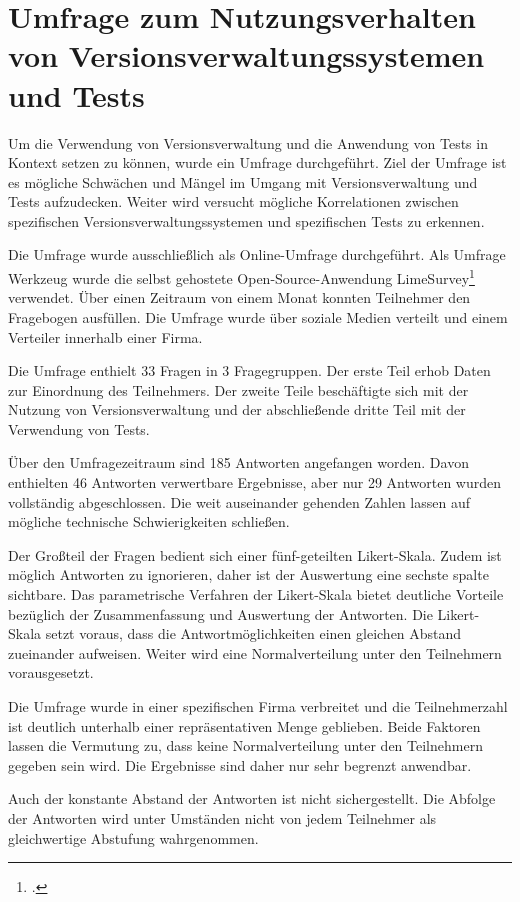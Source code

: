 \section{Umfrage zum Nutzungsverhalten von Versionsverwaltungssystemen und Tests}
\label{survey-vcs-test}

Um die Verwendung von Versionsverwaltung und die Anwendung von Tests in Kontext setzen zu können, wurde ein Umfrage durchgeführt.
Ziel der Umfrage ist es mögliche Schwächen und Mängel im Umgang mit Versionsverwaltung und Tests aufzudecken. Weiter wird versucht mögliche Korrelationen zwischen spezifischen Versionsverwaltungssystemen und spezifischen Tests zu erkennen.

Die Umfrage wurde ausschließlich als Online-Umfrage durchgeführt. Als Umfrage Werkzeug wurde die selbst gehostete Open-Source-Anwendung \glqq LimeSurvey\grqq{}\footcite[][]{limesurvey} verwendet. Über einen Zeitraum von einem Monat konnten Teilnehmer den Fragebogen ausfüllen. Die Umfrage wurde über soziale Medien verteilt und einem Verteiler innerhalb einer Firma.

Die Umfrage enthielt 33 Fragen in 3 Fragegruppen. Der erste Teil erhob Daten zur Einordnung des Teilnehmers. Der zweite Teile beschäftigte sich mit der Nutzung von Versionsverwaltung und der abschließende dritte Teil mit der Verwendung von Tests.

Über den Umfragezeitraum sind 185 Antworten angefangen worden. Davon enthielten 46 Antworten verwertbare Ergebnisse, aber nur 29 Antworten wurden vollständig abgeschlossen. Die weit auseinander gehenden Zahlen lassen auf mögliche technische Schwierigkeiten schließen.

Der Großteil der Fragen bedient sich einer fünf-geteilten Likert-Skala. Zudem ist möglich Antworten zu ignorieren, daher ist der Auswertung eine sechste spalte sichtbare. Das parametrische Verfahren  der Likert-Skala bietet deutliche Vorteile bezüglich der Zusammenfassung und Auswertung der Antworten. Die Likert-Skala setzt voraus, dass die Antwortmöglichkeiten einen gleichen Abstand zueinander aufweisen. Weiter wird eine Normalverteilung unter den Teilnehmern vorausgesetzt. 

Die Umfrage wurde in einer spezifischen Firma verbreitet und die Teilnehmerzahl ist deutlich unterhalb einer repräsentativen Menge geblieben. Beide Faktoren lassen die Vermutung zu, dass keine Normalverteilung unter den Teilnehmern gegeben sein wird. Die Ergebnisse sind daher nur sehr begrenzt anwendbar.

Auch der konstante Abstand der Antworten ist nicht sichergestellt. Die Abfolge der Antworten wird unter Umständen nicht von jedem Teilnehmer als gleichwertige Abstufung wahrgenommen.

